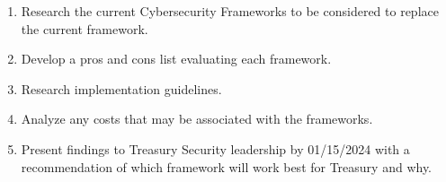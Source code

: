\begin{enumerate}
          
          \item Research the current Cybersecurity Frameworks to be considered to replace the current framework.
          \item Develop a pros and cons list evaluating each framework.
          \item Research implementation guidelines.
          \item Analyze any costs that may be associated with the frameworks.
          \item Present findings to Treasury Security leadership by 01/15/2024 with a recommendation of which framework will work best for Treasury and why.
          
\end{enumerate}